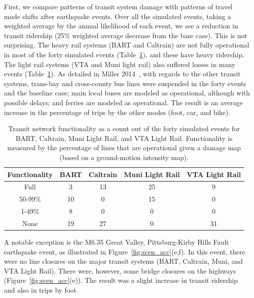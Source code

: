First, we compare patterns of transit system damage with patterns of travel mode shifts after earthquake events. Over all the simulated events, taking a weighted average by the annual likelihood of each event, we see a reduction in transit ridership (25\% weighted average decrease from the base case). This is not surprising. The heavy rail systems (BART and Caltrain) are not fully operational in most of the forty simulated events (Table~\ref{tab:transit}), and these have heavy ridership. The light rail systems (VTA and Muni light rail) also suffered losses in many events (Table~\ref{tab:transit}). As detailed in Miller 2014~\cite{miller_seismic_2014}, with regards to the other transit systems, trans-bay and cross-county bus lines were suspended in the forty events and the baseline case; main local buses are modeled as operational, although with possible delays; and ferries are modeled as operational.
 The result is an average increase in the percentage of trips by the other modes (foot, car, and bike). 

\begin{table}
\centering
\begin{tabular}{c||c|c|c|c}
\textbf{Functionality}           & \textbf{BART} & \textbf{Caltrain} & \textbf{Muni Light Rail} & \textbf{VTA Light Rail}  \\
\hline
Full & 3 & 13 & 25 & 9\\
50-99\%  & 10 & 0 & 15 & 0\\
1-49\%  & 8 & 0 & 0 & 0\\
None & 19 & 27 & 0 & 31\\
\end{tabular}
\caption{Transit network functionality as a count out of the forty simulated events for BART, Caltrain, Muni Light Rail, and VTA Light Rail. Functionality is measured by the percentage of lines that are operational given a damage map (based on a ground-motion intensity map). }
\label{tab:transit}
\end{table}



A notable exception is the M6.35 Great Valley, Pittsburg-Kirby Hills Fault earthquake event, as illustrated in Figure~\ref{fig:scen_acc}{(e,f)}. In this event, there were no line closures on the major transit systems (BART, Caltrain, Muni, and VTA Light Rail). There were, however, some bridge closures on the highways (Figure~\ref{fig:scen_acc}{(e)}). The result was a slight increase in transit ridership and also in trips by foot.


